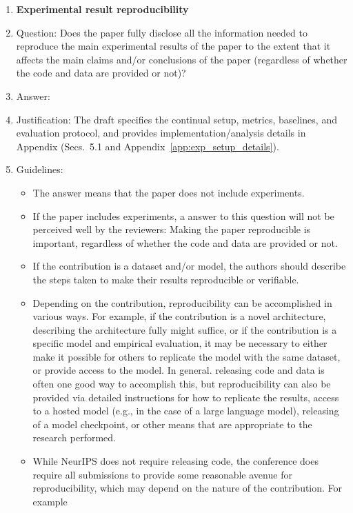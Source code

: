 \documentclass{article}
\begin{document}
\begin{enumerate}
    \item {\bf Experimental result reproducibility}
    \item[] Question: Does the paper fully disclose all the information needed to reproduce the main experimental results of the paper to the extent that it affects the main claims and/or conclusions of the paper (regardless of whether the code and data are provided or not)?
    \item[] Answer: \answerYes{} %
    \item[] Justification: The draft specifies the continual setup, metrics, baselines, and evaluation protocol, and provides implementation/analysis details in Appendix (Secs.~5.1 and Appendix~\ref{app:exp_setup_details}).
    \item[] Guidelines:
    \begin{itemize}
        \item The answer \answerNA{} means that the paper does not include experiments.
        \item If the paper includes experiments, a \answerNo{} answer to this question will not be perceived well by the reviewers: Making the paper reproducible is important, regardless of whether the code and data are provided or not.
        \item If the contribution is a dataset and\slash or model, the authors should describe the steps taken to make their results reproducible or verifiable. 
        \item Depending on the contribution, reproducibility can be accomplished in various ways. For example, if the contribution is a novel architecture, describing the architecture fully might suffice, or if the contribution is a specific model and empirical evaluation, it may be necessary to either make it possible for others to replicate the model with the same dataset, or provide access to the model. In general. releasing code and data is often one good way to accomplish this, but reproducibility can also be provided via detailed instructions for how to replicate the results, access to a hosted model (e.g., in the case of a large language model), releasing of a model checkpoint, or other means that are appropriate to the research performed.
        \item While NeurIPS does not require releasing code, the conference does require all submissions to provide some reasonable avenue for reproducibility, which may depend on the nature of the contribution. For example
        \begin{enumerate}

\end{enumerate}
\end{itemize}
\end{enumerate}
\end{document}
